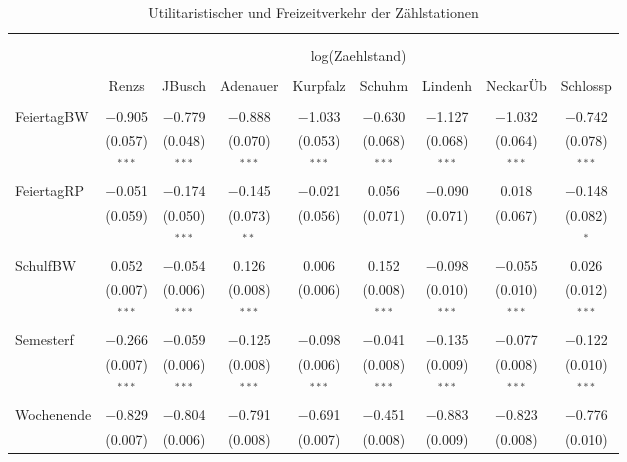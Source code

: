 \documentclass[a4paper,12pt]{thesis}
\begin{document}
\begin{table}[!htbp] \centering 
	\caption{Utilitaristischer und Freizeitverkehr der Zählstationen} 
	\label{utilitarian} 
	\begin{tabular}{@{\extracolsep{-8pt}}lcccccccc} 
		\\[-1.8ex]\hline 
		\hline \\[-1.8ex] 
		\\[-1.8ex] & \multicolumn{8}{c}{log(Zaehlstand)} \\ 
		\\[-1.8ex] & Renzs & JBusch & Adenauer & Kurpfalz & Schuhm & Lindenh & NeckarÜb & Schlossp\\ 
		\hline \\[-1.8ex] 
		FeiertagBW & $-$0.905 & $-$0.779 & $-$0.888 & $-$1.033 & $-$0.630 & $-$1.127 & $-$1.032 & $-$0.742 \\ 
		& (0.057) & (0.048) & (0.070) & (0.053) & (0.068) & (0.068) & (0.064) & (0.078) \\ 
		& $^{***}$ & $^{***}$ & $^{***}$ & $^{***}$ & $^{***}$ & $^{***}$ & $^{***}$ & $^{***}$ \\ 
		FeiertagRP & $-$0.051 & $-$0.174 & $-$0.145 & $-$0.021 & 0.056 & $-$0.090 & 0.018 & $-$0.148 \\ 
		& (0.059) & (0.050) & (0.073) & (0.056) & (0.071) & (0.071) & (0.067) & (0.082) \\ 
		& & $^{***}$ & $^{**}$ & & & & & $^{*}$ \\ 
		SchulfBW & 0.052 & $-$0.054 & 0.126 & 0.006 & 0.152 & $-$0.098 & $-$0.055 & 0.026 \\ 
		& (0.007) & (0.006) & (0.008) & (0.006) & (0.008) & (0.010) & (0.010) & (0.012) \\ 
		& $^{***}$ & $^{***}$ & $^{***}$ & & $^{***}$ & $^{***}$ & $^{***}$ & $^{***}$ \\ 
		Semesterf & $-$0.266 & $-$0.059 & $-$0.125 & $-$0.098 & $-$0.041 & $-$0.135 & $-$0.077 & $-$0.122 \\ 
		& (0.007) & (0.006) & (0.008) & (0.006) & (0.008) & (0.009) & (0.008) & (0.010) \\ 
		& $^{***}$ & $^{***}$ & $^{***}$ & $^{***}$ & $^{***}$ & $^{***}$ & $^{***}$ & $^{***}$ \\ 
		Wochenende & $-$0.829 & $-$0.804 & $-$0.791 & $-$0.691 & $-$0.451 & $-$0.883 & $-$0.823 & $-$0.776 \\ 
		& (0.007) & (0.006) & (0.008) & (0.007) & (0.008) & (0.009) & (0.008) & (0.010) \\ 

\end{tabular}
\end{table}
\end{document}
